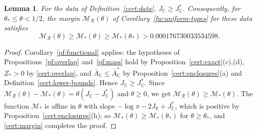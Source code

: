 \documentclass[11pt]{amsart}
\numberwithin{equation}{section}
\newtheorem{lemma}[equation]{Lemma}
\theoremstyle{definition}
\theoremstyle{remark}
\newcommand{\R}{\mathbb R}
\newcommand{\C}{\mathbb C}
\begin{document}
\begin{lemma}\label{cert:lower-margin}
For the data of Definition~\ref{cert:data}, $J_\C\ge J_\C^*$.
Consequently, for $\theta_*\le\theta<1/2$, the margin $\mathcal
M_{\mathcal R}(\theta)$ of Corollary~\ref{fw:uniform-types} for these
data satisfies
\[
 \mathcal M_{\mathcal R}(\theta)\ge\mathcal M_*(\theta)\ge\mathcal
 M_*(\theta_*)>0.000176730033534598 .
\]
\end{lemma}

\begin{proof}
Corollary~\ref{pf:functional} applies: the hypotheses of
Propositions~\ref{pf:overlap} and~\ref{pf:mass} hold by
Proposition~\ref{cert:exact}(c),(d), $Z_*>0$ by \eqref{cert:overlap},
and $\bar A_\C\le\bar A_\C^*$ by Proposition~\ref{cert:enclosures}(a) and
Definition~\ref{cert:lower-bounds}. Hence $J_\C\ge
J_\C^*$. Since $\mathcal M_{\mathcal R}(\theta)-\mathcal
M_*(\theta)=\theta(J_\C-J_\C^*)$ and $\theta\ge0$, we get $\mathcal
M_{\mathcal R}(\theta)\ge\mathcal M_*(\theta)$. The function $\mathcal
M_*$ is affine in $\theta$ with slope $-\log\pi-2J_\R+J_\C^*$, which is
positive by Proposition~\ref{cert:enclosures}(h); so $\mathcal
M_*(\theta)\ge\mathcal M_*(\theta_*)$ for $\theta\ge\theta_*$, and
\eqref{cert:margin} completes the proof.
\end{proof}
\end{document}
